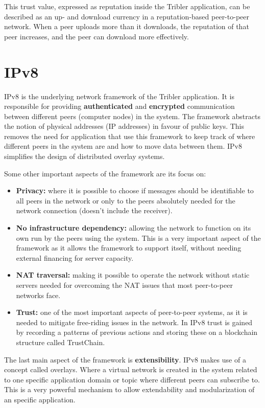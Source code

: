 This trust value, expressed as reputation inside the Tribler application, can be described as an up- and download currency in a reputation-based peer-to-peer network. When a peer uploads more than it downloads, the reputation of that peer increases, and the peer can download more effectively.

\section{IPv8}

IPv8 is the underlying network framework of the Tribler application. It is responsible for providing \textbf{authenticated} and \textbf{encrypted} communication between different peers (computer nodes) in the system. The framework abstracts the notion of physical addresses (IP addresses) in favour of public keys. This removes the need for application that use this framework to keep track of where different peers in the system are and how to move data between them. IPv8 simplifies the design of distributed overlay systems. 

Some other important aspects of the framework are its focus on:
\begin{itemize}
	\item \textbf{Privacy:} where it is possible to choose if messages should be identifiable to all peers in the network or only to the peers absolutely needed for the network connection (doesn't include the receiver). 
	\item \textbf{No infrastructure dependency:} allowing the network to function on its own run by the peers using the system. This is a very important aspect of the framework as it allows the framework to support itself, without needing external financing for server capacity.
	\item \textbf{NAT traversal:} making it possible to operate the network without static servers needed for overcoming the NAT issues that most peer-to-peer networks face.
	\item \textbf{Trust:} one of the most important aspects of peer-to-peer systems, as it is needed to mitigate free-riding issues in the network. In IPv8 trust is gained by recording a patterns of previous actions and storing these on a blockchain structure called TrustChain.
\end{itemize}

The last main aspect of the framework is \textbf{extensibility}. IPv8 makes use of a concept called overlays. Where a virtual network is created in the system related to one specific application domain or topic where different peers can subscribe to. This is a very powerful mechanism to allow extendability and modularization of an specific application.

